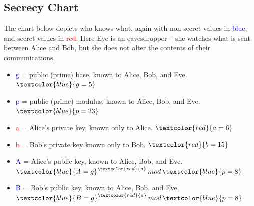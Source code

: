 \subsection{Secrecy Chart}\label{subsec:secrecy-chart}
The chart below depicts who knows what, again with non-secret values in \textcolor{blue}{blue}, and secret values in \textcolor{red}{red}.
Here Eve is an eavesdropper – she watches what is sent between Alice and Bob, but she does not alter the contents of their communications.
\begin{itemize}
    \item \textcolor{blue}{g} = public (prime) base, known to Alice, Bob, and Eve. $\textcolor{blue}{g = 5}$
    \item \textcolor{blue}{p} = public (prime) modulus, known to Alice, Bob, and Eve. $\textcolor{blue}{p = 23}$
    \item \textcolor{red}{a} = Alice's private key, known only to Alice. $\textcolor{red}{a = 6}$
    \item \textcolor{red}{b} = Bob's private key known only to Bob. $\textcolor{red}{b = 15}$
    \item \textcolor{blue}{A} = Alice's public key, known to Alice, Bob, and Eve. $\textcolor{blue}{A = g}^{\textcolor{red}{a}} \, mod \, \textcolor{blue}{p = 8}$
    \item \textcolor{blue}{B} = Bob's public key, known to Alice, Bob, and Eve. $\textcolor{blue}{B = g}^{\textcolor{red}{a}} \, mod \, \textcolor{blue}{p = 8}$
\end{itemize}
